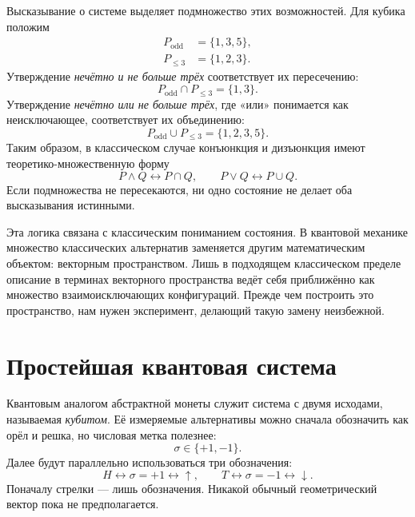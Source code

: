 Высказывание о системе выделяет подмножество этих возможностей. Для кубика положим
\begin{align}
  P_{\mathrm{odd}}&=\{1,3,5\},\\
  P_{\leq 3}&=\{1,2,3\}.
\end{align}
Утверждение \emph{нечётно и не больше трёх} соответствует их пересечению:
\begin{equation}
  P_{\mathrm{odd}}\cap P_{\leq 3}=\{1,3\}.
\end{equation}
Утверждение \emph{нечётно или не больше трёх}, где «или» понимается как неисключающее, соответствует их объединению:
\begin{equation}
  P_{\mathrm{odd}}\cup P_{\leq 3}
  =
  \{1,2,3,5\}.
\end{equation}
Таким образом, в классическом случае конъюнкция и дизъюнкция имеют теоретико-множественную форму
\begin{equation}
  P\wedge Q\longleftrightarrow P\cap Q,
  \qquad
  P\vee Q\longleftrightarrow P\cup Q.
\end{equation}
Если подмножества не пересекаются, ни одно состояние не делает оба высказывания истинными.

Эта логика связана с классическим пониманием состояния. В квантовой механике множество классических альтернатив заменяется другим математическим объектом: векторным пространством. Лишь в подходящем классическом пределе описание в терминах векторного пространства ведёт себя приближённо как множество взаимоисключающих конфигураций. Прежде чем построить это пространство, нам нужен эксперимент, делающий такую замену неизбежной.

\section{Простейшая квантовая система}

Квантовым аналогом абстрактной монеты служит система с двумя исходами, называемая \emph{кубитом}. Её измеряемые альтернативы можно сначала обозначить как орёл и решка, но числовая метка полезнее:
\begin{equation}
  \sigma\in\{+1,-1\}.
\end{equation}
Далее будут параллельно использоваться три обозначения:
\begin{equation}
  H\longleftrightarrow \sigma=+1\longleftrightarrow\uparrow,
  \qquad
  T\longleftrightarrow \sigma=-1\longleftrightarrow\downarrow.
\end{equation}
Поначалу стрелки — лишь обозначения. Никакой обычный геометрический вектор пока не предполагается.

